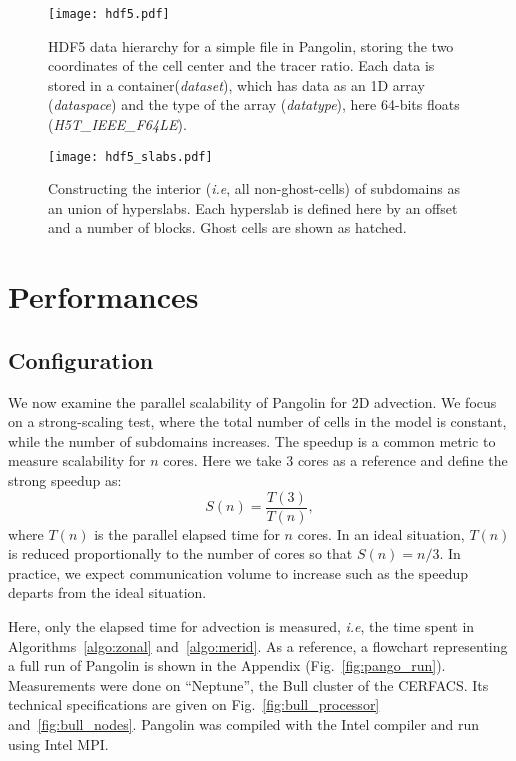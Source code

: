 \begin{figure}
  \begin{minipage}{0.49\linewidth}
    \texttt{[image: hdf5.pdf]}
    \caption{HDF5 data hierarchy for a simple file in Pangolin, storing the two
      coordinates of the cell center and the tracer ratio. Each data is stored
      in a container(\textit{dataset}), which has data as an 1D array
      (\textit{dataspace}) and  the type of the array (\textit{datatype}), here
      64-bits floats (\textit{H5T\_IEEE\_F64LE}).}
    \label{fig:hdf5}
  \end{minipage}  
  \hfill
  \begin{minipage}{0.45\linewidth}
    \texttt{[image: hdf5\_slabs.pdf]}
    \caption{Constructing the interior (\textit{i.e}, all non-ghost-cells) of subdomains as
    an union of hyperslabs.  Each hyperslab is defined here by an offset and a
  number of blocks. Ghost cells are shown as hatched.}
    \label{fig:hdf5_slabs}
  \end{minipage}  
\end{figure}

\section{Performances}
\label{sec:performances}
\subsection{Configuration}
We now examine the parallel scalability of Pangolin for 2D advection. We focus
on a strong-scaling test, where the total number of cells in the model is
constant, while the number of subdomains increases. The speedup is a common metric
to measure scalability for $n$ cores. Here we take 3 cores as a reference and
define the strong speedup as:
\begin{equation}
  S(n) = \frac{T(3)}{T(n)},
  \label{eq:speedup}
\end{equation}
where $T(n)$ is the parallel elapsed time for $n$ cores. In an ideal situation,
$T(n)$ is reduced proportionally to the number of cores so that $S(n) = n/3$. In
practice, we expect communication volume to increase such as the speedup departs
from the ideal situation.

Here, only the elapsed time for advection is measured, \textit{i.e}, the time
spent in Algorithms~\ref{algo:zonal} and~\ref{algo:merid}. As a reference, a
flowchart representing a full run of Pangolin is shown in the Appendix
(Fig.~\ref{fig:pango_run}). Measurements were done on ``Neptune'', the Bull
cluster of the CERFACS. Its technical specifications are given on
Fig.~\ref{fig:bull_processor} and~\ref{fig:bull_nodes}. Pangolin was compiled
with the Intel compiler and run using Intel MPI.

